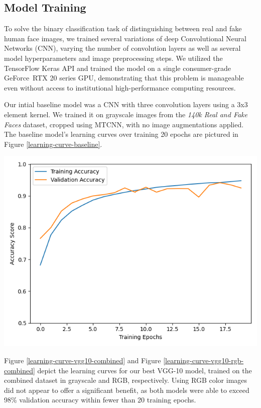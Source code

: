 \documentclass[11pt, letterpaper]{article}
\newenvironment{Figure}
  {\par\medskip\noindent\minipage{\linewidth}}
  {\endminipage\par\medskip}
\begin{document}
\begin{multicols}{2}
  \subsection{Model Training}

  To solve the binary classification task of distinguishing between
  real and fake human face images, we trained several variations of
  deep Convolutional Neural Networks (CNN), varying the number of
  convolution layers as well as several model hyperparameters and
  image preprocessing steps. We utilized the TensorFlow Keras API and
  trained the model on a single consumer-grade
  GeForce\texttrademark\ RTX 20 series GPU, demonstrating that this
  problem is manageable even without access to institutional
  high-performance computing resources.

  Our intial baseline model was a CNN with three convolution layers
  using a 3x3 element kernel. We trained it on grayscale images from
  the \emph{140k Real and Fake Faces} dataset, cropped using MTCNN, with no
  image augmentations applied. The baseline model's learning curves
  over training 20 epochs are pictured in Figure
  \ref{learning-curve-baseline}.

  \begin{Figure}
    \centering
    \includegraphics[width=1.0\textwidth]{figures/learning-curve-baseline-cropped-grayscale-noaug.png}
    \label{learning-curve-baseline}
  \end{Figure}

  Figure \ref{learning-curve-vgg10-combined} and Figure
  \ref{learning-curve-vgg10-rgb-combined} depict the learning curves
  for our best VGG-10 model, trained on the combined dataset in
  grayscale and RGB, respectively. Using RGB color images did not
  appear to offer a significant benefit, as both models were able to
  exceed 98\% validation accuracy within fewer than 20 training
  epochs.


\end{multicols}
\end{document}
